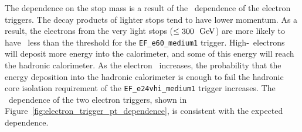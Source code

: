 \begin{table}[bh]
  \caption{
    Requirements for the triggers used in this analysis.
  }
  \label{tab:trigger_defs}
\end{table}

The dependence on the stop mass is a result of the \ET\ dependence of the
electron triggers.
The decay products of lighter stops tend to have lower momentum.
As a result, the electrons from the very light stops ($\leq 300~\GeV$) 
are more likely to have \ET\ less than the threshold for the
\texttt{EF\_e60\_medium1} trigger.
High-\ET\ electrons will deposit more energy into the calorimeter,
and some of this energy will reach the hadronic calorimeter.
As the electron \ET\ increases, the probability that the energy deposition into
the hadronic calorimeter is enough to fail the hadronic core isolation
requirement of the \texttt{EF\_e24vhi\_medium1} trigger increases.
The \ET\ dependence of the two electron triggers, shown in
Figure~\ref{fig:electron_trigger_pt_dependence}, is consistent with the expected
dependence.

